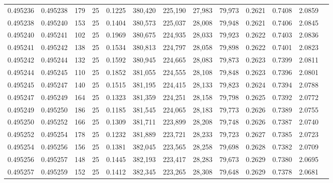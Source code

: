 \begin{tabular}{rrrrrrrrrrrrr}
0.495236 & 0.495238 &   179 &  25 &                                     0.1225 & 380,420 & 225,190 &  27,983 &  79,973 & 0.2621 & 0.7408 & 2.0859 \\
0.495238 & 0.495240 &   153 &  25 &                                     0.1404 & 380,573 & 225,037 &  28,008 &  79,948 & 0.2621 & 0.7406 & 2.0845 \\
0.495240 & 0.495241 &   102 &  25 &                                     0.1969 & 380,675 & 224,935 &  28,033 &  79,923 & 0.2622 & 0.7403 & 2.0836 \\
0.495241 & 0.495242 &   138 &  25 &                                     0.1534 & 380,813 & 224,797 &  28,058 &  79,898 & 0.2622 & 0.7401 & 2.0823 \\
0.495242 & 0.495244 &   132 &  25 &                                     0.1592 & 380,945 & 224,665 &  28,083 &  79,873 & 0.2623 & 0.7399 & 2.0811 \\
0.495244 & 0.495245 &   110 &  25 &                                     0.1852 & 381,055 & 224,555 &  28,108 &  79,848 & 0.2623 & 0.7396 & 2.0801 \\
0.495245 & 0.495247 &   140 &  25 &                                     0.1515 & 381,195 & 224,415 &  28,133 &  79,823 & 0.2624 & 0.7394 & 2.0788 \\
0.495247 & 0.495249 &   164 &  25 &                                     0.1323 & 381,359 & 224,251 &  28,158 &  79,798 & 0.2625 & 0.7392 & 2.0772 \\
0.495249 & 0.495250 &   186 &  25 &                                     0.1185 & 381,545 & 224,065 &  28,183 &  79,773 & 0.2626 & 0.7389 & 2.0755 \\
0.495250 & 0.495252 &   166 &  25 &                                     0.1309 & 381,711 & 223,899 &  28,208 &  79,748 & 0.2626 & 0.7387 & 2.0740 \\
0.495252 & 0.495254 &   178 &  25 &                                     0.1232 & 381,889 & 223,721 &  28,233 &  79,723 & 0.2627 & 0.7385 & 2.0723 \\
0.495254 & 0.495256 &   156 &  25 &                                     0.1381 & 382,045 & 223,565 &  28,258 &  79,698 & 0.2628 & 0.7382 & 2.0709 \\
0.495256 & 0.495257 &   148 &  25 &                                     0.1445 & 382,193 & 223,417 &  28,283 &  79,673 & 0.2629 & 0.7380 & 2.0695 \\
0.495257 & 0.495259 &   152 &  25 &                                     0.1412 & 382,345 & 223,265 &  28,308 &  79,648 & 0.2629 & 0.7378 & 2.0681 \\

\end{tabular}
